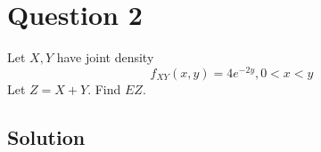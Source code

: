 \section*{Question 2}

Let \( X, Y \) have joint density
\[
    f_{X Y}(x, y)=4 e^{-2 y}, 0<x<y
\]
Let \( Z=X+Y \).
Find \( E Z \).

\subsection*{Solution}
